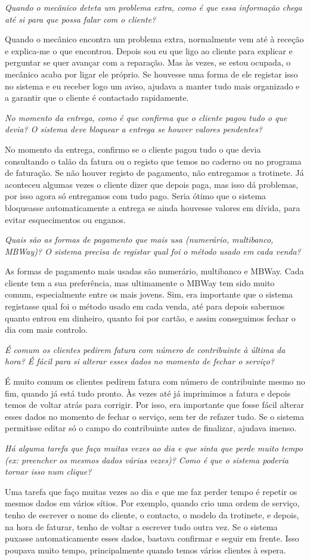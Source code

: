 \documentclass[11pt,a4paper]{article}
\newcommand{\pergunta}[1]{\item[P:] \textit{#1}}
\newcommand{\resposta}[1]{\item[R:] #1}
\begin{document}
\begin{transcription}
		\pergunta{Quando o mecânico deteta um problema extra, como é que essa informação chega até si para que possa falar com o cliente?}
		\resposta{Quando o mecânico encontra um problema extra, normalmente vem até à receção e explica-me o que encontrou. Depois sou eu que ligo ao cliente para explicar e perguntar se quer avançar com a reparação. Mas às vezes, se estou ocupada, o mecânico acaba por ligar ele próprio. Se houvesse uma forma de ele registar isso no sistema e eu receber logo um aviso, ajudava a manter tudo mais organizado e a garantir que o cliente é contactado rapidamente.}
		
		\pergunta{No momento da entrega, como é que confirma que o cliente pagou tudo o que devia? O sistema deve bloquear a entrega se houver valores pendentes?}
		\resposta{No momento da entrega, confirmo se o cliente pagou tudo o que devia consultando o talão da fatura ou o registo que temos no caderno ou no programa de faturação. Se não houver registo de pagamento, não entregamos a trotinete. Já aconteceu algumas vezes o cliente dizer que depois paga, mas isso dá problemas, por isso agora só entregamos com tudo pago. Seria ótimo que o sistema bloqueasse automaticamente a entrega se ainda houvesse valores em dívida, para evitar esquecimentos ou enganos.}
		
		\pergunta{Quais são as formas de pagamento que mais usa (numerário, multibanco, MBWay)? O sistema precisa de registar qual foi o método usado em cada venda?}
		\resposta{As formas de pagamento mais usadas são numerário, multibanco e MBWay. Cada cliente tem a sua preferência, mas ultimamente o MBWay tem sido muito comum, especialmente entre os mais jovens. Sim, era importante que o sistema registasse qual foi o método usado em cada venda, até para depois sabermos quanto entrou em dinheiro, quanto foi por cartão, e assim conseguimos fechar o dia com mais controlo.}
		
		\pergunta{É comum os clientes pedirem fatura com número de contribuinte à última da hora? É fácil para si alterar esses dados no momento de fechar o serviço?}
		\resposta{É muito comum os clientes pedirem fatura com número de contribuinte mesmo no fim, quando já está tudo pronto. Às vezes até já imprimimos a fatura e depois temos de voltar atrás para corrigir. Por isso, era importante que fosse fácil alterar esses dados no momento de fechar o serviço, sem ter de refazer tudo. Se o sistema permitisse editar só o campo do contribuinte antes de finalizar, ajudava imenso.}
		
		\pergunta{Há alguma tarefa que faça muitas vezes ao dia e que sinta que perde muito tempo (ex: preencher os mesmos dados várias vezes)? Como é que o sistema poderia tornar isso num clique?}
		\resposta{Uma tarefa que faço muitas vezes ao dia e que me faz perder tempo é repetir os mesmos dados em vários sítios. Por exemplo, quando crio uma ordem de serviço, tenho de escrever o nome do cliente, o contacto, o modelo da trotinete, e depois, na hora de faturar, tenho de voltar a escrever tudo outra vez. Se o sistema puxasse automaticamente esses dados, bastava confirmar e seguir em frente. Isso poupava muito tempo, principalmente quando temos vários clientes à espera.}
		

\end{transcription}
\end{document}
